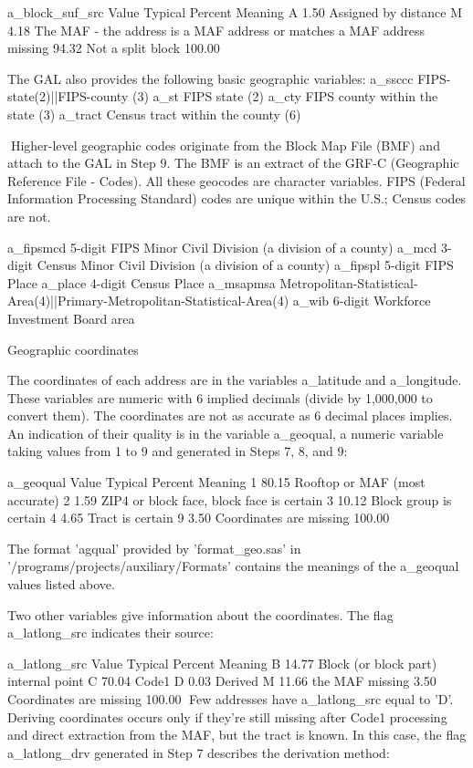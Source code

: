 a_block_suf_src
Value  Typical Percent   Meaning
A               1.50          Assigned by distance
M               4.18          The MAF - the address is a MAF address or matches a MAF address
missing                94.32       Not a split block
              100.00

The GAL also provides the following basic geographic variables:
a_ssccc        FIPS-state(2)||FIPS-county (3)
a_st      FIPS state (2)
a_cty          FIPS county within the state (3)
a_tract        Census tract within the county (6)

Higher-level geographic codes originate from the Block Map File (BMF) and attach to the GAL in Step
9. The BMF is an extract of the GRF-C (Geographic Reference File - Codes). All these geocodes are
character variables. FIPS (Federal Information Processing Standard) codes are unique within the U.S.;
Census codes are not.

a_fipsmcd 5-digit FIPS Minor Civil Division (a division of a county)
a_mcd          3-digit Census Minor Civil Division (a division of a county)
a_fipspl  5-digit FIPS Place
a_place        4-digit Census Place
a_msapmsa Metropolitan-Statistical-Area(4)||Primary-Metropolitan-Statistical-Area(4)
a_wib          6-digit Workforce Investment Board area

Geographic coordinates

The coordinates of each address are in the variables a_latitude and a_longitude. These variables are
numeric with 6 implied decimals (divide by 1,000,000 to convert them). The coordinates are not as
accurate as 6 decimal places implies. An indication of their quality is in the variable a_geoqual, a
numeric variable taking values from 1 to 9 and generated in Steps 7, 8, and 9:

a_geoqual
Value  Typical Percent   Meaning
1              80.15          Rooftop or MAF (most accurate)
2               1.59          ZIP4 or block face, block face is certain
3              10.12          Block group is certain
4               4.65          Tract is certain
9               3.50          Coordinates are missing
              100.00

The format 'agqual' provided by 'format_geo.sas' in '/programs/projects/auxiliary/Formats' contains the
meanings of the a_geoqual values listed above.

Two other variables give information about the coordinates. The flag a_latlong_src indicates their
source: 

a_latlong_src
Value  Typical Percent   Meaning
B              14.77          Block (or block part) internal point
C              70.04          Code1
D               0.03          Derived
M              11.66          the MAF
missing                 3.50       Coordinates are missing
              100.00
Few addresses have a_latlong_src equal to 'D'. Deriving coordinates occurs only if they're still missing
after Code1 processing and direct extraction from the MAF, but the tract is known. In this case, the flag
a_latlong_drv generated in Step 7 describes the derivation method:

